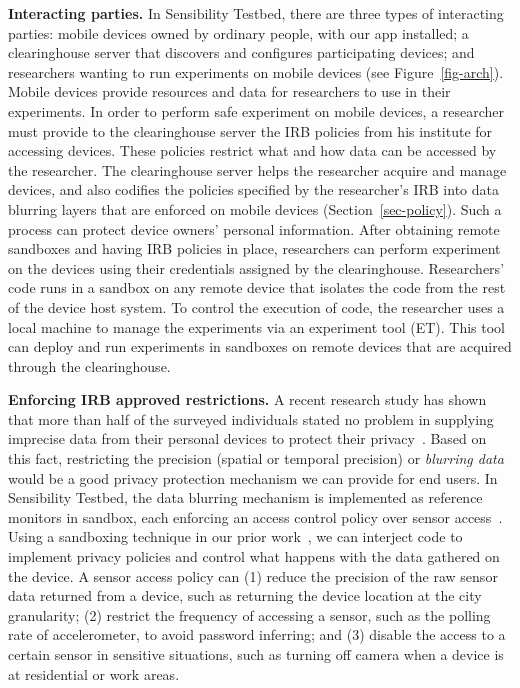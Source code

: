 \textbf{Interacting parties.}
In Sensibility Testbed, there are three types of interacting
parties: mobile devices owned by ordinary people, with our app
installed; a clearinghouse server that discovers and configures
participating devices; and researchers wanting to run
experiments on mobile devices (see Figure~\ref{fig-arch}). Mobile devices
provide resources and data for researchers to use in their
experiments. In order to perform safe experiment on mobile
devices, a researcher must provide to the clearinghouse server
the IRB policies from his institute for accessing devices. These 
policies restrict what and how data can be accessed by the 
researcher. The
clearinghouse server helps the researcher acquire and manage
devices, and also codifies the policies specified by the
researcher's IRB into data blurring layers that are enforced on
mobile devices (Section~\ref{sec-policy}). Such a process can protect device
owners' personal information. After obtaining remote sandboxes
and having IRB policies in place, researchers can perform
experiment on the devices using their credentials assigned by
the clearinghouse. Researchers' code runs in a sandbox on any
remote device that isolates the code from the rest of the device
host system. To control the execution of code, the researcher
uses a local machine to manage the experiments via an experiment
tool (ET). This tool can deploy and run experiments in sandboxes
on remote devices that are acquired through the clearinghouse.

\textbf{Enforcing IRB approved restrictions.}
A recent research study has shown that more than half of the 
surveyed individuals stated no problem in supplying imprecise 
data from their personal devices to protect their 
privacy~\cite{fawaz2014location}. Based on this fact, restricting 
the precision (spatial or temporal precision) or \textit{blurring 
data} would be a good privacy protection mechanism we can 
provide for end users. In Sensibility Testbed, the data blurring 
mechanism is implemented as reference monitors in sandbox, 
each enforcing an access control 
policy over sensor access~\cite{ref}. Using a sandboxing 
technique in our prior work~\cite{cappos2010retaining}, we can 
interject code to implement privacy policies and control what 
happens with the data gathered on the device. A sensor access 
policy can (1) reduce 
the precision of the raw sensor data returned from a device, such
as returning the device location at the city granularity; (2) restrict 
the frequency of accessing a sensor, such as the polling rate of 
accelerometer, to avoid password inferring; and (3) disable the 
access to a certain sensor in sensitive situations, such as 
turning off camera when a device is at residential or work areas.

